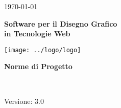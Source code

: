  
\title{\TITOLODOC}
\author{Carollo Mirko}
 

 
\renewcommand{\insertversion}{3.0} %
\renewcommand{\TITOLODOC}{Norme di Progetto} %
\renewcommand{\glosspath}{.\glossario} %
 
\begin{titlepage}
\begin{center}
  \begin{Large}  \today \end{Large}
\end{center}
 
\vspace{20pt}
 
\begin{center}
  \begin{Huge}
        \textbf{\ajax}
  \end{Huge}
\end{center}      
 
\begin{center}
  \begin{large}
        \textbf{Software per il Disegno Grafico\\ in Tecnologie Web}
  \end{large}
\end{center}      
 
\vspace{20pt}
 
\begin{center}
\texttt{[image: ../logo/logo]}
\end{center}
 
\vspace{170pt}
\begin{center} %
  \begin{Huge}
        \textbf{\TITOLODOC}
  \end{Huge}
      \\
\end{center}
\vspace{190pt}
\begin{center}
Versione: \insertversion
\end{center}
\end{titlepage}
 
